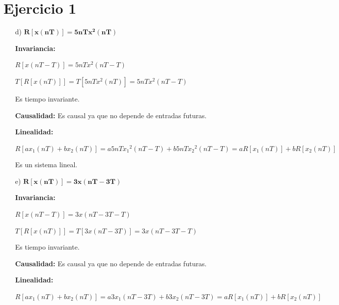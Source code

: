 








\section*{Ejercicio 1}
\begin{itemize}
	\item[d)] $\mathbf{R \left[ x \left( nT \right) \right] = 5nT x^2 \left( nT \right)}$ 
	
		\textbf{Invariancia:}
		
		$R \left[ x \left( nT - T \right) \right] = 5nT x^2 \left( nT -T \right)$ 
		
		$T \left[ R \left[ x \left( nT \right) \right] \right] = T \left[ 5nT x^2 \left( nT \right) \right] = 5nT x^2 \left( nT -T \right)$ 
		
		Es tiempo invariante.
		
		\textbf{Causalidad:} Es causal ya que no depende de entradas futuras.
		
		\textbf{Linealidad:}
		
		 $R \left[ ax_1 \left( nT \right) + bx_2 \left( nT \right) \right] = a5nT {x_{1}}^{2} \left( nT -T \right) + b5nT {x_{2}}^{2} \left( nT -T \right) = aR \left[ x_1 \left( nT \right) \right] + bR \left[ x_2 \left( nT \right) \right]$

		Es un sistema lineal.
		
	\item[e)] $\mathbf{R \left[ x \left( nT \right) \right] = 3x \left( nT - 3T\right)}$ 
	
		\textbf{Invariancia:}
		
		$R \left[ x \left( nT - T \right) \right] = 3x \left( nT - 3T -T \right)$ 
		
		$T \left[ R \left[ x \left( nT \right) \right] \right] = T \left[ 3x \left( nT - 3T \right) \right] = 3x \left( nT - 3T -T \right)$ 
		
		Es tiempo invariante.
		
		\textbf{Causalidad:} Es causal ya que no depende de entradas futuras.
		
		\textbf{Linealidad:}
		
		 $R \left[ ax_1 \left( nT \right) + bx_2 \left( nT \right) \right] = a3 x_{1} \left( nT - 3T \right) + b3 x_{2} \left( nT - 3T \right) = aR \left[ x_1 \left( nT \right) \right] + bR \left[ x_2 \left( nT \right) \right]$


\end{itemize}
